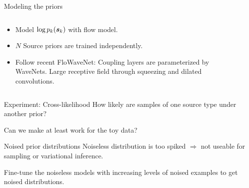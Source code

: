 \documentclass{beamer}
\begin{document}
    \begin{frame}{Modeling the priors}
        \begin{columns}
            \begin{column}{0.6\textwidth}
                \begin{itemize}
                    \item Model \(\log p_k(\s_k)\) with flow model.
                    \item \(N\) Source priors are trained independently.
                    \item Follow recent FloWaveNet\footnotemark: Coupling layers are parameterized by WaveNets. Large receptive field through squeezing and dilated convolutions.
                \end{itemize}
            \end{column}
            \begin{column}{0.4\textwidth}
                
            \end{column}
        \end{columns}
    \end{frame}

    \begin{frame}{Experiment: Cross-likelihood}
        How likely are samples of one source type under another prior?
        \begin{figure}
            \centering
            
        \end{figure}
        Can we make at least work for the toy data?
    \end{frame}

    \begin{frame}{Noised prior distributions}
        Noiseless distribution is too spiked \(\Rightarrow\) not useable for sampling or variational inference.

        Fine-tune the noiseless models with increasing levels of noised examples to get noised distributions.
    \end{frame}
\end{document}
